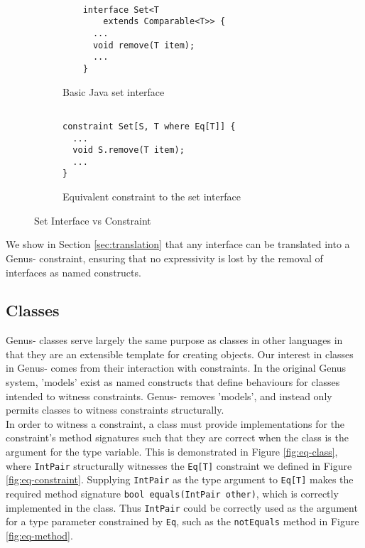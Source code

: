 \begin{figure}[h]
    \centering
    \begin{subfigure}[t]{0.45\textwidth}
        \centering
        \begin{verbatim}
        
    interface Set<T 
        extends Comparable<T>> {
      ...
      void remove(T item);
      ...
    }
        \end{verbatim}
        \caption{Basic Java set interface}
    \end{subfigure}
    \hfill
    \begin{subfigure}[t]{0.45\textwidth}
        \centering
        \begin{verbatim}
        
constraint Set[S, T where Eq[T]] {
  ...
  void S.remove(T item);
  ...
}
        \end{verbatim}
        \caption{Equivalent constraint to the set interface}
    \end{subfigure}
    \caption{Set Interface vs Constraint}
    \label{fig:interface-constraint}
\end{figure}

We show in Section \ref{sec:translation} that any interface can be translated into a Genus- constraint, ensuring that no expressivity is lost by the removal of interfaces as named constructs. \\

\subsection{Classes} \label{sec:genus-classes}

Genus- classes serve largely the same purpose as classes in other languages in that they are an extensible template for creating objects. Our interest in classes in Genus- comes from their interaction with constraints. In the original Genus system, 'models' exist as named constructs that define behaviours for classes intended to witness constraints. Genus- removes 'models', and instead only permits classes to witness constraints structurally. \\

In order to witness a constraint, a class must provide implementations for the constraint's method signatures such that they are correct when the class is the argument for the type variable. This is demonstrated in Figure \ref{fig:eq-class}, where \texttt{IntPair} structurally witnesses the \texttt{Eq[T]} constraint we defined in Figure \ref{fig:eq-constraint}. Supplying \texttt{IntPair} as the type argument to \texttt{Eq[T]} makes the required method signature \texttt{bool equals(IntPair other)}, which is correctly implemented in the class. Thus \texttt{IntPair} could be correctly used as the argument for a type parameter constrained by \texttt{Eq}, such as the \texttt{notEquals} method in Figure \ref{fig:eq-method}. \\

